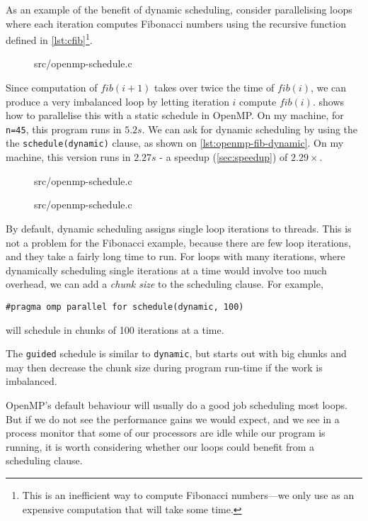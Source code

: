 As an example of the benefit of dynamic scheduling, consider
parallelising loops where each iteration computes Fibonacci numbers
using the recursive function defined in \cref{lst:cfib}\footnote{This
  is an inefficient way to compute Fibonacci numbers---we only use as
  an expensive computation that will take some time.}.

\begin{figure}

{src/openmp-schedule.c}
\end{figure}

Since computation of $fib(i+1)$ takes over twice the time of $fib(i)$,
we can produce a very imbalanced loop by letting iteration $i$ compute
$fib(i)$.   shows how to parallelise this
with a static schedule in OpenMP.  On my machine, for \texttt{n=45},
this program runs in $5.2s$.  We can ask for dynamic scheduling by
using the the \texttt{schedule(dynamic)} clause, as shown on
\cref{lst:openmp-fib-dynamic}.  On my machine, this version runs in
$2.27s$ - a speedup (\cref{sec:speedup}) of $2.29\times$.

\begin{figure}

{src/openmp-schedule.c}
\end{figure}

\begin{figure}

{src/openmp-schedule.c}
\end{figure}

By default, dynamic scheduling assigns single loop iterations to
threads.  This is not a problem for the Fibonacci example, because
there are few loop iterations, and they take a fairly long time to
run.  For loops with many iterations, where dynamically scheduling
single iterations at a time would involve too much overhead, we can
add a \emph{chunk size} to the scheduling clause.  For example,
\begin{lstlisting}
#pragma omp parallel for schedule(dynamic, 100)
\end{lstlisting}
will schedule in chunks of 100 iterations at a time.

The \texttt{guided} schedule is similar to \texttt{dynamic}, but
starts out with big chunks and may then decrease the chunk size during
program run-time if the work is imbalanced.

OpenMP's default behaviour will usually do a good job scheduling most
loops.  But if we do not see the performance gains we would expect,
and we see in a process monitor that some of our processors are idle
while our program is running, it is worth considering whether our
loops could benefit from a scheduling clause.

